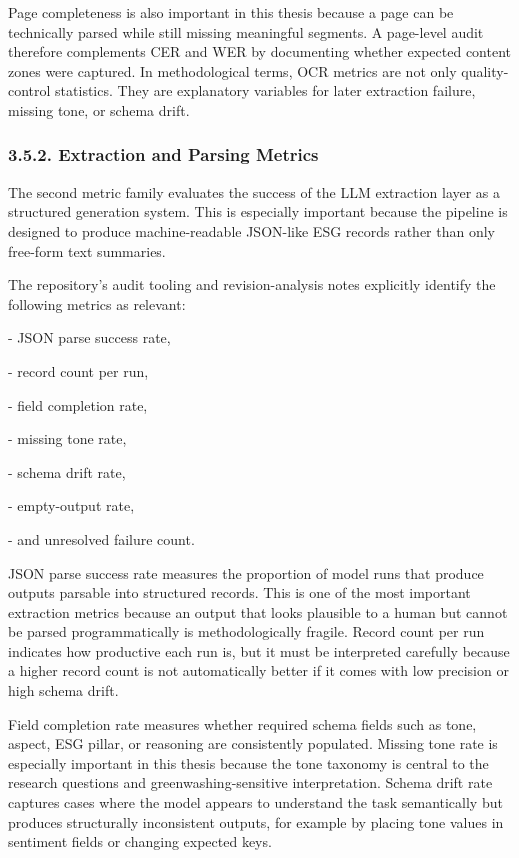 \documentclass{article}
\begin{document}
Page completeness is also important in this thesis because a page can be technically parsed while still missing meaningful segments. A page-level audit therefore complements CER and WER by documenting whether expected content zones were captured. In methodological terms, OCR metrics are not only quality-control statistics. They are explanatory variables for later extraction failure, missing tone, or schema drift.
\subsubsection*{ 3.5.2. Extraction and Parsing Metrics}

The second metric family evaluates the success of the LLM extraction layer as a structured generation system. This is especially important because the pipeline is designed to produce machine-readable JSON-like ESG records rather than only free-form text summaries.

The repository’s audit tooling and revision-analysis notes explicitly identify the following metrics as relevant:

- JSON parse success rate,

- record count per run,

- field completion rate,

- missing tone rate,

- schema drift rate,

- empty-output rate,

- and unresolved failure count.

JSON parse success rate measures the proportion of model runs that produce outputs parsable into structured records. This is one of the most important extraction metrics because an output that looks plausible to a human but cannot be parsed programmatically is methodologically fragile. Record count per run indicates how productive each run is, but it must be interpreted carefully because a higher record count is not automatically better if it comes with low precision or high schema drift.

Field completion rate measures whether required schema fields such as tone, aspect, ESG pillar, or reasoning are consistently populated. Missing tone rate is especially important in this thesis because the tone taxonomy is central to the research questions and greenwashing-sensitive interpretation. Schema drift rate captures cases where the model appears to understand the task semantically but produces structurally inconsistent outputs, for example by placing tone values in sentiment fields or changing expected keys.
\end{document}

